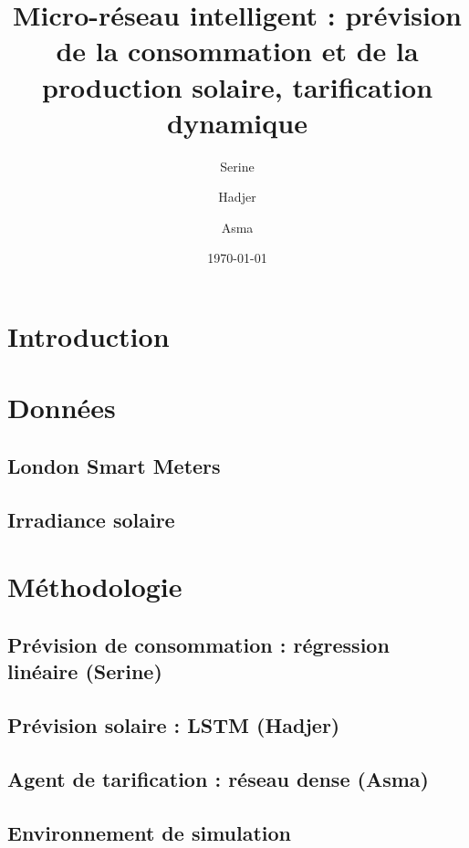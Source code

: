 \documentclass[11pt,a4paper]{article}
\title{Micro-réseau intelligent : prévision de la consommation et de la production solaire, tarification dynamique}
\author{Serine \and Hadjer \and Asma}
\date{\today}
\begin{document}
\maketitle

\begin{abstract}
\end{abstract}

\tableofcontents

\section{Introduction}

\section{Données}
\subsection{London Smart Meters}
\subsection{Irradiance solaire}

\section{Méthodologie}
\subsection{Prévision de consommation : régression linéaire (Serine)}
\subsection{Prévision solaire : LSTM (Hadjer)}
\subsection{Agent de tarification : réseau dense (Asma)}
\subsection{Environnement de simulation}
\end{document}
